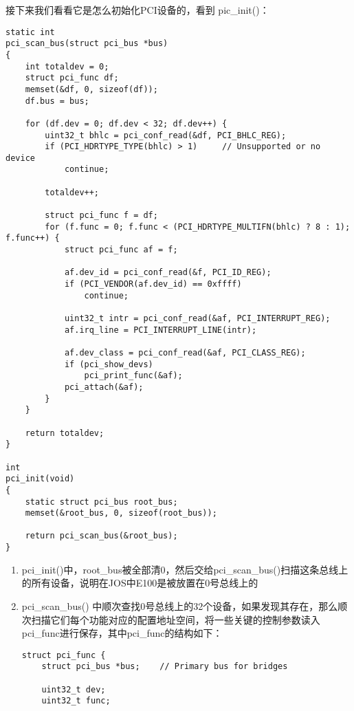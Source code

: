 \documentclass{article}
\newcommand{\funcname}[1]{{\ttfamily \small #1}}
\begin{document}
\begin{CJK*}{UTF8}{gkai}
接下来我们看看它是怎么初始化PCI设备的，看到 \funcname{pic\_init()}：


\begin{lstlisting}[style=ccode, firstnumber=36, title={\scriptsize \ttfamily \bfseries kern/pci.c}]
static int 
pci_scan_bus(struct pci_bus *bus)
{
    int totaldev = 0;
    struct pci_func df;
    memset(&df, 0, sizeof(df));
    df.bus = bus;
	
    for (df.dev = 0; df.dev < 32; df.dev++) {
        uint32_t bhlc = pci_conf_read(&df, PCI_BHLC_REG);
        if (PCI_HDRTYPE_TYPE(bhlc) > 1)	    // Unsupported or no device
            continue;
		
        totaldev++;
		
        struct pci_func f = df;
        for (f.func = 0; f.func < (PCI_HDRTYPE_MULTIFN(bhlc) ? 8 : 1); f.func++) {
            struct pci_func af = f;
			
            af.dev_id = pci_conf_read(&f, PCI_ID_REG);
            if (PCI_VENDOR(af.dev_id) == 0xffff)
                continue;
			
            uint32_t intr = pci_conf_read(&af, PCI_INTERRUPT_REG);
            af.irq_line = PCI_INTERRUPT_LINE(intr);
			
            af.dev_class = pci_conf_read(&af, PCI_CLASS_REG);
            if (pci_show_devs)
                pci_print_func(&af);
            pci_attach(&af);
        }
    }
	
    return totaldev;
}

int
pci_init(void)
{
	static struct pci_bus root_bus;
	memset(&root_bus, 0, sizeof(root_bus));
	
	return pci_scan_bus(&root_bus);
}
\end{lstlisting}

\begin{enumerate}
\item{\funcname{pci\_init()}中，root\_bus被全部清0，然后交给\funcname{pci\_scan\_bus()}扫描这条总线上的所有设备，说明在JOS中E100是被放置在0号总线上的}
\item{\funcname{pci\_scan\_bus()} 中顺次查找0号总线上的32个设备，如果发现其存在，那么顺次扫描它们每个功能对应的配置地址空间，将一些关键的控制参数读入pci\_func进行保存，其中pci\_func的结构如下：

\begin{lstlisting}[style=ccode, firstnumber=11, title={\scriptsize \ttfamily \bfseries kern/pci.h}]
struct pci_func {
    struct pci_bus *bus;	// Primary bus for bridges

    uint32_t dev;
    uint32_t func;


\end{lstlisting}}
\end{enumerate}
\end{CJK*}
\end{document}
